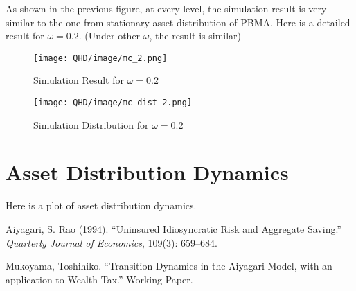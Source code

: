 \documentclass[11pt,a4paper]{article}
\begin{document}
As shown in the previous figure, at every level, the simulation result is very similar to the one from stationary asset distribution of PBMA. Here is a detailed result for $\omega=0.2$. (Under other $\omega$, the result is similar)
\begin{figure}[h!]
    \centering
    \texttt{[image: QHD/image/mc\_2.png]}
    \caption{Simulation Result for $\omega=0.2$}
\end{figure}

\begin{figure}[h!]
    \centering
    \texttt{[image: QHD/image/mc\_dist\_2.png]}
    \caption{Simulation Distribution for $\omega=0.2$}
\end{figure}

\section{Asset Distribution Dynamics}
Here is a plot of asset distribution dynamics. 


\newpage


\begin{thebibliography}{9}

Aiyagari, S. Rao (1994).
\newblock ``Uninsured Idiosyncratic Risk and Aggregate Saving.''
\newblock \textit{Quarterly Journal of Economics}, 109(3): 659--684.

Mukoyama, Toshihiko.
\newblock ``Transition Dynamics in the Aiyagari Model, with an application to Wealth Tax.''
\newblock Working Paper.

\end{thebibliography}
\end{document}
